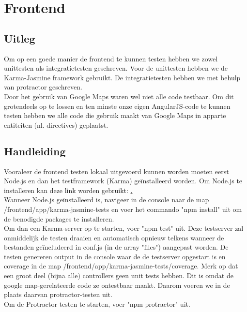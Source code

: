 \documentclass[11pt,twoside,a4paper]{article}
\begin{document}
\newpage

\section*{Frontend}

\subsection*{Uitleg}
Om op een goede manier de frontend te kunnen testen hebben we zowel unittesten als integratietesten geschreven. Voor de unittesten hebben we de Karma-Jasmine framework gebruikt. De integratietesten hebben we met behulp van protractor geschreven.\\
Door het gebruik van Google Maps waren wel niet alle code testbaar. Om dit grotendeels op te lossen en ten minste onze eigen AngularJS-code te kunnen testen hebben we alle code die gebruik maakt van Google Maps in apparte entiteiten (nl. directives) geplaatst.

\subsection*{Handleiding}

Vooraleer de frontend testen lokaal uitgevoerd kunnen worden moeten eerst Node.js en dan het testframework (Karma) geïnstalleerd worden. Om Node.js te installeren kan deze link worden gebruikt: \href{https://nodejs.org/en/download/}.\\

Wanneer Node.js geïnstalleerd is, navigeer in de console naar de map /frontend/app/karma-jasmine-tests en voer het commando "npm install" uit om de benodigde packages te installeren.\\

Om dan een Karma-server op te starten, voer "npm test" uit. Deze testserver zal onmiddelijk de testen draaien en automatisch opnieuw telkens wanneer de bestanden geïncludeerd in conf.js (in de array "files") aangepast worden. De testen genereren output in de console waar de de testserver opgestart is en coverage in de map /frontend/app/karma-jasmine-tests/coverage.
Merk op dat een groot deel (bijna alle) controllers geen unit tests hebben. Dit is omdat de google map-gerelateerde code ze ontestbaar maakt. Daarom voeren we in de plaats daarvan protractor-testen uit.\\
Om de Protractor-testen te starten, voer "npm protractor" uit.


 
\end{document}
